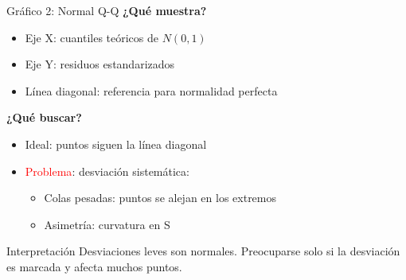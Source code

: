 \documentclass[aspectratio=169, 11pt]{beamer}
\begin{document}
\begin{frame}{Gráfico 2: Normal Q-Q}
\textbf{¿Qué muestra?}
\begin{itemize}
\item Eje X: cuantiles teóricos de $N(0,1)$
\item Eje Y: residuos estandarizados
\item Línea diagonal: referencia para normalidad perfecta
\end{itemize}

\vspace{0.3cm}
\textbf{¿Qué buscar?}
\begin{itemize}
\item \textcolor{javerianalight}{Ideal}: puntos siguen la línea diagonal
\item \textcolor{red}{Problema}: desviación sistemática:
  \begin{itemize}
  \item Colas pesadas: puntos se alejan en los extremos
  \item Asimetría: curvatura en S
  \end{itemize}
\end{itemize}

\vspace{0.3cm}
\begin{block}{Interpretación}
Desviaciones leves son normales. Preocuparse solo si la desviación es marcada y afecta muchos puntos.
\end{block}
\end{frame}
\end{document}
